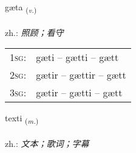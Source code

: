 \documentclass[frontgrid, backgrid]{flacards}\usepackage[]{graphicx}\usepackage[]{xcolor}
\begin{document}
\renewcommand{\blhead}{\vskip5pt {\small\bfseries\footnotesize Sagnorð | 动词 }}
\renewcommand{\bcfoot}{\vskip5pt \hspace{2pt}{\small\bfseries\footnotesize 1K}}


{gæta \small{\textsubscript{(\textit{v.})}} \\[1ex] %
\textphonetic{[caiːta]} \\
zh.: \emph{照顾；看守} \\  [2ex]
\renewcommand*{\arraystretch}{0.8}
\begin{tabular}{p{1cm}l}
\textsc{1sg}: & gæti -- gætti -- gætt \\ 
\textsc{2sg}: & gætir -- gættir -- gætt \\ 
\textsc{3sg}: & gætir -- gætti -- gætt \\ 
\end{tabular}
}

\renewcommand{\flhead}{\vskip5pt \fboxsep=0pt {\small\bfseries\footnotesize Nafnorð | 名词}}
\renewcommand{\fcfoot}{\vskip5pt \fboxsep=0pt \hspace{2pt}{\small\bfseries\footnotesize 1K}}

\renewcommand{\blhead}{\vskip5pt {\small\bfseries\footnotesize Nafnorð | 名词 }}
\renewcommand{\bcfoot}{\vskip5pt \hspace{2pt}{\small\bfseries\footnotesize 1K}}


{texti \small{\textsubscript{(\textit{m.})}} \\[1ex] %
\textphonetic{[tʰɛkstɪ]} \\
zh.: \emph{文本；歌词；字幕} \\  [2ex]
\renewcommand*{\arraystretch}{0.8}
}

\renewcommand{\flhead}{\vskip5pt \fboxsep=0pt {\small\bfseries\footnotesize Nafnorð | 名词}}
\renewcommand{\fcfoot}{\vskip5pt \fboxsep=0pt \hspace{2pt}{\small\bfseries\footnotesize 1K}}
\end{document}
